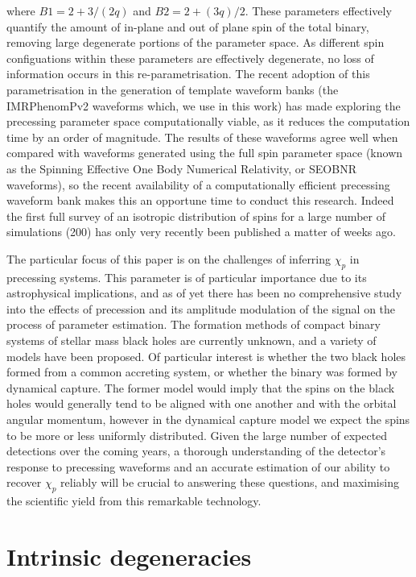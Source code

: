 \documentclass[11pt]{article}
\begin{document}
where $B1=2+3/(2q)$ and $B2=2+(3q)/2$. These parameters effectively quantify the amount of in-plane and out of plane spin of the total binary, removing large degenerate portions of the parameter space. As different spin configuations within these parameters are effectively degenerate, no loss of information occurs in this re-parametrisation. The recent adoption of this parametrisation in the generation of template waveform banks (the IMRPhenomPv2 waveforms which, we use in this work) has made exploring the precessing parameter space computationally viable, as it reduces the computation time by an order of magnitude. The results of these waveforms agree well when compared with waveforms generated using the full spin parameter space (known as the Spinning Effective One Body Numerical Relativity, or SEOBNR waveforms)\cite{spin}\cite{eob}, so the recent availability of a computationally efficient precessing waveform bank makes this an opportune time to conduct this research. Indeed the first full survey of an isotropic distribution of spins for a large number of simulations (200) has only very recently been published a matter of weeks ago\cite{pe_latest}.

The particular focus of this paper is on the challenges of inferring $\chi_p$ in precessing systems. This parameter is of particular importance due to its astrophysical implications, and as of yet there has been no comprehensive study into the effects of precession and its amplitude modulation of the signal on the process of parameter estimation. The formation methods of compact binary systems of stellar mass black holes are currently unknown, and a variety of models have been proposed\cite{modal}. Of particular interest is whether the two black holes formed from a common accreting system, or whether the binary was formed by dynamical capture. The former model would imply that the spins on the black holes would generally tend to be aligned with one another and with the orbital angular momentum, however in the dynamical capture model we expect the spins to be more or less uniformly distributed. Given the large number of expected detections over the coming years, a thorough understanding of the detector's response to precessing waveforms and an accurate estimation of our ability to recover $\chi_p$ reliably will be crucial to answering these questions, and maximising the scientific yield from this remarkable technology.
\section{Intrinsic degeneracies}
\end{document}

